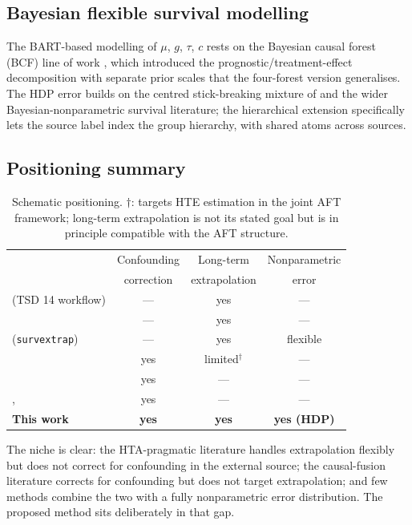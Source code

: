 \documentclass[11pt]{article}
\theoremstyle{plain}
\theoremstyle{definition}
\theoremstyle{remark}
\newcommand{\1}{\mathds{1}}
\newcommand{\tauf}{\tau}
\newcommand{\cf}{c}
\newcommand{\gf}{g}
\newcommand{\muf}{\mu}
\begin{document}
\subsection{Bayesian flexible survival modelling}

The BART-based modelling of $\muf$, $\gf$, $\tauf$, $\cf$ rests on the
Bayesian causal forest (BCF) line of work \citep{hahn2020bayesian}, which introduced
the prognostic/treatment-effect decomposition with separate prior scales
that the four-forest version generalises. The HDP error builds on the
centred stick-breaking mixture of \citet{yang2010semiparametric} and the wider
Bayesian-nonparametric survival literature; the hierarchical extension
specifically lets the source label index the group hierarchy, with shared
atoms across sources.

\subsection{Positioning summary}

\begin{table}[tb]
\centering\small
\begin{tabular}{lccc}
\toprule
& Confounding & Long-term      & Nonparametric \\
& correction  & extrapolation  & error         \\
\midrule
\citet{Latimer2013} (TSD 14 workflow)        & --- & yes & ---  \\
\citet{Guyot2017}                            & --- & yes & ---  \\
\citet{Jackson2023} (\texttt{survextrap})    & --- & yes & flexible \\
\citet{Ye2025}                               & yes & limited$^\dagger$ & --- \\
\citet{YangLiuZengWang2025}                  & yes & ---       & --- \\
\citet{Kallus2018}, \citet{Yao2024}          & yes & ---       & --- \\
\textbf{This work}                           & \textbf{yes} & \textbf{yes} & \textbf{yes (HDP)} \\
\bottomrule
\end{tabular}
\caption{Schematic positioning. $\dagger$: \citet{Ye2025} targets HTE
estimation in the joint AFT framework; long-term extrapolation is not its
stated goal but is in principle compatible with the AFT structure.}
\end{table}

The niche is clear: the HTA-pragmatic literature handles extrapolation
flexibly but does not correct for confounding in the external source; the
causal-fusion literature corrects for confounding but does not target
extrapolation; and few methods combine the two with a fully nonparametric
error distribution. The proposed method sits deliberately in that gap.



\end{document}
